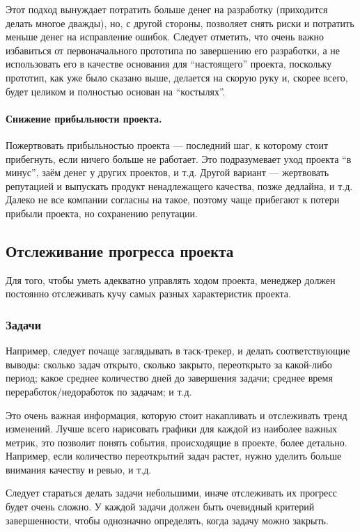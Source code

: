 \documentclass{../../text-style}
\begin{document}
Этот подход вынуждает потратить больше денег на разработку (приходится делать многое дважды), но, с другой стороны, позволяет снять риски и потратить меньше денег на исправление ошибок. Следует отметить, что очень важно избавиться от первоначального прототипа по завершению его разработки, а не использовать его в качестве основания для \enquote{настоящего} проекта, поскольку прототип, как уже было сказано выше, делается на скорую руку и, скорее всего, будет целиком и полностью основан на \enquote{костылях}.

\paragraph{Снижение прибыльности проекта.} Пожертвовать прибыльностью проекта --- последний шаг, к которому стоит прибегнуть, если ничего больше не работает. Это подразумевает уход проекта \enquote{в минус}, заём денег у других проектов, и т.д. Другой вариант --- жертвовать репутацией и выпускать продукт ненадлежащего качества, позже дедлайна, и т.д. Далеко не все компании согласны на такое, поэтому чаще прибегают к потери прибыли проекта, но сохранению репутации.

\subsection{Отслеживание прогресса проекта}

Для того, чтобы уметь адекватно управлять ходом проекта, менеджер должен постоянно отслеживать кучу самых разных характеристик проекта.

\subsubsection{Задачи}

Например, следует почаще заглядывать в таск-трекер, и делать соответствующие выводы: сколько задач открыто, сколько закрыто, переоткрыто за какой-либо период; какое среднее количество дней до завершения задачи; среднее время переработок/недоработок по задачам; и т.д.

Это очень важная информация, которую стоит накапливать и отслеживать тренд изменений. Лучше всего нарисовать графики для каждой из наиболее важных метрик, это позволит понять события, происходящие в проекте, более детально. Например, если количество переоткрытий задач растет, нужно уделить больше внимания качеству и ревью, и т.д. 

Следует стараться делать задачи небольшими, иначе отслеживать их прогресс будет очень сложно. У каждой задачи должен быть очевидный критерий завершенности, чтобы однозначно определять, когда задачу можно закрыть.
\end{document}

